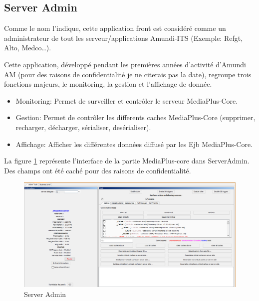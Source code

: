 \subsection{Server Admin}
\par Comme le nom l'indique, cette application front est considéré comme un administrateur de tout les serveur/applications Amundi-ITS (Exemple: Refgt, Alto, Medco\dots).
\par Cette application, développé pendant les premières années d'activité d'Amundi AM (pour des raisons de confidentialité je ne citerais pas la date), regroupe trois fonctions majeurs, le monitoring, la gestion et l'affichage de donnée.
\begin{itemize}
    \item Monitoring: Permet de surveiller et contrôler le serveur MediaPlus-Core.
    \item Gestion: Permet de contrôler les differents caches MediaPlus-Core (supprimer, recharger, décharger, sérialiser, desérialiser).
    \item Affichage: Afficher les différentes données diffusé par les Ejb MediaPlus-Core.
\end{itemize}
\par La figure \ref{fig:serveradmin} représente l'interface de la partie MediaPlus-core dans ServerAdmin. Des champs ont été caché pour des raisons de confidentialité.
\begin{figure}[ht]
    \centering
    \includegraphics[width=\columnwidth]{img/serveradmin.png}
    \caption{Server Admin}
    \label{fig:serveradmin}
\end{figure}

